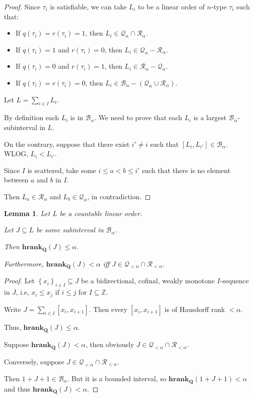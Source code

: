 \documentclass{article}
\newtheorem{lemma}{Lemma}
\newcommand{\braces}[1]{\left\{ {#1} \right\}}
\newcommand{\setcomp}[1]{\braces{#1}}
\newcommand{\hrank}[1]{\mathbf{hrank}_{\qq}\left( #1 \right)}
\newcommand{\qq}{\mathbf{Q}}
\newcommand{\ZZ}{\mathbb{Z}}
\begin{document}
\begin{proof}
  Since $\tau_i$ is satisfiable, we can take $L_i$ to be a linear order of $n$-type
  $\tau_i$ such that:

  \begin{itemize}
    \item If $q(\tau_i) = r(\tau_i) = 1$, then $L_i \in \mathcal{Q}_{\alpha} \cap \mathcal{R}_{\alpha}$.
    \item If $q(\tau_i) = 1$ and $r(\tau_i) = 0$, then $L_i \in \mathcal{Q}_{\alpha} - \mathcal{R}_{\alpha}$.
    \item If $q(\tau_i) = 0$ and $r(\tau_i) = 1$, then $L_i \in \mathcal{R}_{\alpha} - \mathcal{Q}_{\alpha}$.
    \item If $q(\tau_i) = r(\tau_i) = 0$, then $L_i \in \mathcal{B}_{\alpha} - (\mathcal{Q}_{\alpha} \cup \mathcal{R}_{\alpha})$.
  \end{itemize}

  Let $L = \sum_{i \in I} L_i$.

  By definition each $L_i$ is in $\mathcal{B}_{\alpha}$. We need to prove
  that each $L_i$ is a largest $\mathcal{B}_{\alpha}$-subinterval in $L$.

  On the contrary, suppose that there exist $i' \ne i$ such that $[L_i, L_{i'}] \in \mathcal{B}_{\alpha}$.
  WLOG, $L_i < L_{i'}$.

  Since $I$ is scattered, take some $i \le a < b \le i'$ such that
  there is no element between $a$ and $b$ in $I$.

  Then $L_a \in \mathcal{R}_{\alpha}$ and $L_b \in \mathcal{Q}_{\alpha}$, in contradiction.
\end{proof}

\begin{lemma}
  Let $L$ be a countable linear order.

  Let $J \subseteq L$ be some subinterval in $\mathcal{B}_{\alpha}$.

  Then $\hrank{J} \le \alpha$.

  Furthermore, $\hrank{J} < \alpha$ iff $J \in \mathcal{Q_{< \alpha}} \cap \mathcal{R_{< \alpha}}$.
\end{lemma}

\begin{proof}
  Let $\setcomp{x_i}_{i \in I} \subseteq J$ be a bidirectional, cofinal, weakly monotone $I$-sequence in $J$, i.e,
  $x_i \le x_j$ if $i \le j$ for $I \subseteq \ZZ$.

  Write $J = \sum_{i \in I} [x_i, x_{i+1}]$. Then every $[x_i, x_{i+1}]$ is of Hausdorff rank $< \alpha$.

  Thus, $\hrank{J} \le \alpha$.

  Suppose $\hrank{J} < \alpha$, then obviously $J \in \mathcal{Q_{< \alpha}} \cap \mathcal{R_{< \alpha}}$.

  Conversely, suppose $J \in \mathcal{Q_{< \alpha}} \cap \mathcal{R_{< \alpha}}$.

  Then $1 + J + 1 \in \mathcal{B}_{\alpha}$. But it is a bounded interval,
  so $\hrank{1 + J + 1} < \alpha$ and thus $\hrank{J} < \alpha$.
\end{proof}
\end{document}
